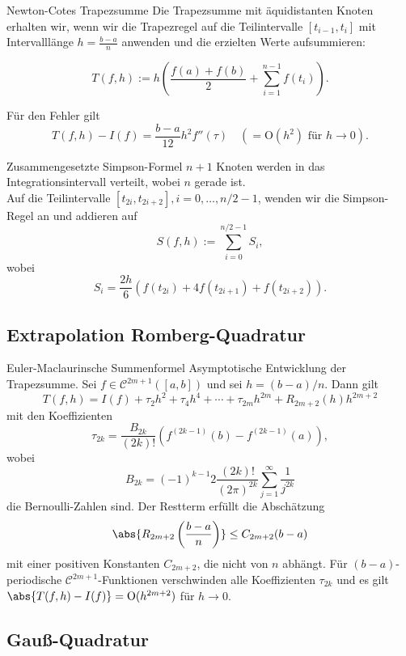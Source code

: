 \begin{karte}{Newton-Cotes Trapezsumme}
    Die Trapezsumme mit äquidistanten Knoten erhalten wir, wenn wir die Trapezregel auf die 
    Teilintervalle \( [t_{i-1}, t_i] \) mit Intervalllänge \( h = \frac{b-a}{n} \) 
    anwenden und die erzielten Werte aufsummieren:

    \[ T(f,h) := h\left( \frac{f(a) + f(b)}{2} + \sum_{i=1}^{n-1} f(t_i) \right). \]

    Für den Fehler gilt 
    \[ T(f,h) - I(f) = \frac{b-a}{12} h^2 f''(\tau) \quad (=\mathrm{O}(h^2) \text{ für } h\rightarrow 0). \]
\end{karte}

\begin{karte}{Zusammengesetzte Simpson-Formel}
    \( n+1 \) Knoten werden in das Integrationsintervall verteilt, wobei \(n\) gerade ist. \\
    Auf die Teilintervalle \( [t_{2i}, t_{2i+2}], i = 0,\ldots, n/2-1 \), wenden wir die Simpson-Regel an 
    und addieren auf 
    \[ S(f,h) := \sum_{i=0}^{n/2-1} S_i, \]
    wobei 
    \[ S_i = \frac{2h}{6} ( f(t_{2i}) + 4f(t_{2i+1}) + f(t_{2i+2}) ). \]
\end{karte}

\subsection*{Extrapolation Romberg-Quadratur}

\begin{karte}{Euler-Maclaurinsche Summenformel}
    Asymptotische Entwicklung der Trapezsumme.
    Sei \(f \in \mathcal{C}^{2m+1}([a,b])\) und sei \( h = (b-a)/n \). Dann gilt 
    \[ T(f,h) = I(f) + \tau_2 h^2 + \tau_4 h^4 + \cdots + \tau_{2m} h^{2m} + R_{2m+2}(h) h^{2m+2} \]
    mit den Koeffizienten 
    \[ \tau_{2k} = \frac{B_{2k}}{(2k)!} \left( f^{(2k-1)}(b) - f^{(2k-1)}(a) \right), \]
    wobei 
    \[ B_{2k} = (-1)^{k-1} 2 \frac{(2k)!}{(2\pi)^{2k}} \sum_{j=1}^\infty \frac{1}{j^{2k}} \]
    die Bernoulli-Zahlen sind. Der Restterm erfüllt die Abschätzung 
    \[ \abs{ R_{2m+2}\left( \frac{b-a}{n} \right) } \leq C_{2m+2}(b-a) \]
    mit einer positiven Konstanten \( C_{2m+2} \), die nicht von \(n\) abhängt.
    Für \( (b-a) \)-periodische \( \mathcal{C}^{2m+1} \)-Funktionen verschwinden alle Koeffizienten 
    \( \tau_{2k} \) und es gilt \( \abs{ T(f,h) - I(f) } = \mathrm{O}(h^{2m+2}) \) für \(h\rightarrow 0\).
\end{karte}

\subsection*{Gauß-Quadratur}

